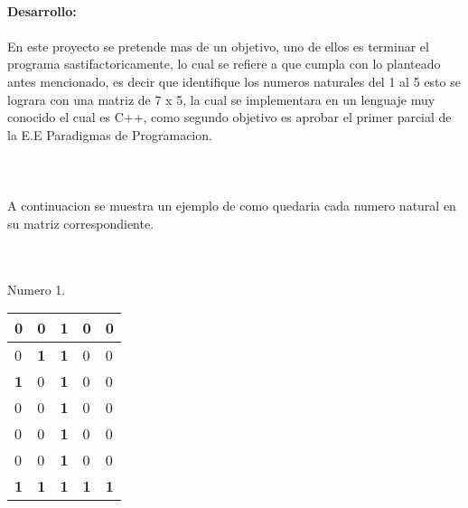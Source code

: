 \documentclass[40pt]{article}
\begin{document}
\maketitle
\textsf{\ \\
\textbf{Desarrollo:}\\
\\
En este proyecto se pretende mas de un objetivo, uno de ellos es terminar el programa sastifactoricamente, lo cual se refiere a que cumpla con lo planteado antes mencionado, es decir que identifique los numeros naturales del 1 al 5 esto se lograra con una matriz de 7 x 5, la cual se implementara en un lenguaje muy conocido el cual es C++, como segundo objetivo es aprobar el primer parcial de la E.E Paradigmas de Programacion.
\\
\\
\\
\\
A continuacion se muestra un ejemplo de como quedaria cada numero natural en su matriz correspondiente. \\}

\maketitle
\textsf{\\
\\
Numero 1.\\}

\vspace{0.0 cm}
\begin{table}[h!]
\begin{tabular}{|p{.3 cm}|p{.3 cm}|p{.3 cm}|p{.3 cm}|p{.3 cm}| }
\hline
0&0&\textbf{1}&0&0
\\\hline
0&\textbf{1}&\textbf{1}&0&0
\\\hline
\textbf{1}&0&\textbf{1}&0&0
\\\hline
0&0&\textbf{1}&0&0
\\\hline
0&0&\textbf{1}&0&0
\\\hline
0&0&\textbf{1}&0&0
\\\hline
\textbf{1}&\textbf{1}&\textbf{1}&\textbf{1}&\textbf{1}
\\\hline
\end{tabular}
\end{table}
\end{document}
